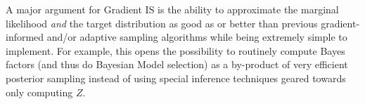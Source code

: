 A major argument for Gradient IS is the ability to approximate the marginal likelihood \emph{and} the target distribution as good as or better than previous gradient-informed and/or adaptive sampling algorithms while being extremely simple to implement. For example, this opens the possibility to routinely compute Bayes factors (and thus do Bayesian Model selection) as a by-product of very  efficient posterior sampling instead of using special inference techniques geared towards only computing $Z$.
